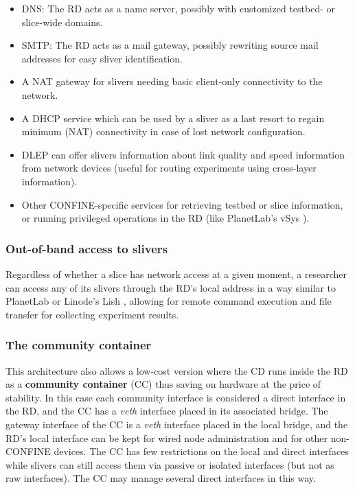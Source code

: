 \documentclass[conference]{IEEEtran}
\begin{document}
\begin{itemize}
\item DNS: The RD acts as a name server, possibly with customized testbed- or
  slice-wide domains.
\item SMTP: The RD acts as a mail gateway, possibly rewriting source mail
  addresses for easy sliver identification.
\item A NAT gateway for slivers needing basic client-only connectivity to the
  network.
\item A DHCP service which can be used by a sliver as a last resort to regain
  minimum (NAT) connectivity in case of lost network configuration.
\item DLEP \cite{dlep} can offer slivers information about link quality and
  speed information from network devices (useful for routing experiments using
  cross-layer information).
\item Other CONFINE-specific services for retrieving testbed or slice
  information, or running privileged operations in the RD (like PlanetLab's
  vSys \cite{vsys}).
\end{itemize}


\subsubsection{Out-of-band access to slivers}

Regardless of whether a slice has network access at a given moment, a
researcher can access any of its slivers through the RD's local address in a
way similar to PlanetLab or Linode's Lish \cite{lish}, allowing for remote
command execution and file transfer for collecting experiment results.


\subsubsection{The community container}

This architecture also allows a low-cost version where the CD runs inside the
RD as a \textbf{community container} (CC) thus saving on hardware at the price
of stability.  In this case each community interface is considered a direct
interface in the RD, and the CC has a \emph{veth} interface placed in its
associated bridge.  The gateway interface of the CC is a \emph{veth} interface
placed in the local bridge, and the RD's local interface can be kept for wired
node administration and for other non-CONFINE devices.  The CC has few
restrictions on the local and direct interfaces while slivers can still access
them via passive or isolated interfaces (but not as raw interfaces).  The CC
may manage several direct interfaces in this way.
\end{document}
